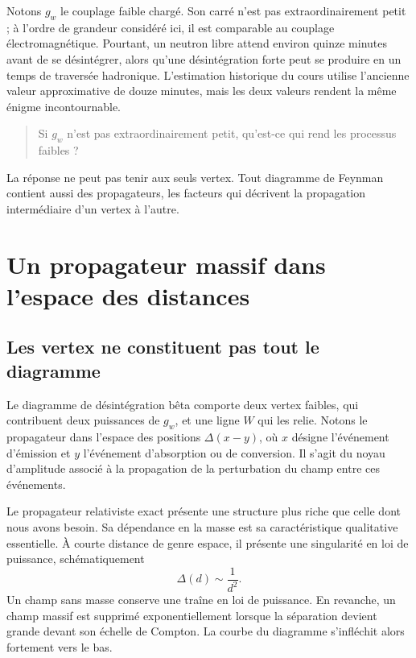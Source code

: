 Notons \(g_w\) le couplage faible chargé. Son carré n’est pas extraordinairement petit ; à l’ordre de grandeur considéré ici, il est comparable au couplage électromagnétique. Pourtant, un neutron libre attend environ quinze minutes avant de se désintégrer, alors qu’une désintégration forte peut se produire en un temps de traversée hadronique. L’estimation historique du cours utilise l’ancienne valeur approximative de douze minutes, mais les deux valeurs rendent la même énigme incontournable.
\begin{quote}
Si \(g_w\) n’est pas extraordinairement petit, qu’est-ce qui rend les processus faibles ?
\end{quote}

La réponse ne peut pas tenir aux seuls vertex. Tout diagramme de Feynman contient aussi des propagateurs, les facteurs qui décrivent la propagation intermédiaire d’un vertex à l’autre.

\section{Un propagateur massif dans l’espace des distances}

\subsection{Les vertex ne constituent pas tout le diagramme}

Le diagramme de désintégration bêta comporte deux vertex faibles, qui contribuent deux puissances de \(g_w\), et une ligne \(W\) qui les relie. Notons le propagateur dans l’espace des positions \(\Delta(x-y)\), où \(x\) désigne l’événement d’émission et \(y\) l’événement d’absorption ou de conversion. Il s’agit du noyau d’amplitude associé à la propagation de la perturbation du champ entre ces événements.

Le propagateur relativiste exact présente une structure plus riche que celle dont nous avons besoin. Sa dépendance en la masse est sa caractéristique qualitative essentielle. À courte distance de genre espace, il présente une singularité en loi de puissance, schématiquement
\begin{equation}
  \Delta(d)\sim\frac1{d^2}.
\end{equation}
Un champ sans masse conserve une traîne en loi de puissance. En revanche, un champ massif est supprimé exponentiellement lorsque la séparation devient grande devant son échelle de Compton. La courbe du diagramme s’infléchit alors fortement vers le bas.

